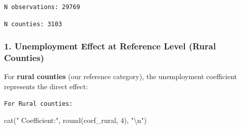 \documentclass[
  11pt,
]{article}
\newenvironment{Shaded}{\begin{snugshade}}{\end{snugshade}}
\newcommand{\DecValTok}[1]{\textcolor[rgb]{0.68,0.00,0.00}{#1}}
\newcommand{\FunctionTok}[1]{\textcolor[rgb]{0.28,0.35,0.67}{#1}}
\newcommand{\NormalTok}[1]{\textcolor[rgb]{0.00,0.23,0.31}{#1}}
\newcommand{\OtherTok}[1]{\textcolor[rgb]{0.00,0.23,0.31}{#1}}
\newcommand{\SpecialCharTok}[1]{\textcolor[rgb]{0.37,0.37,0.37}{#1}}
\newcommand{\StringTok}[1]{\textcolor[rgb]{0.13,0.47,0.30}{#1}}
\begin{document}
\begin{verbatim}
N observations: 29769 
\end{verbatim}

\begin{Shaded}
\end{Shaded}

\begin{verbatim}
N counties: 3103 
\end{verbatim}

\subsubsection{1. Unemployment Effect at Reference Level (Rural
Counties)}\label{unemployment-effect-at-reference-level-rural-counties}

For \textbf{rural counties} (our reference category), the unemployment
coefficient represents the direct effect:

\begin{Shaded}
\end{Shaded}

\begin{verbatim}
For Rural counties:
\end{verbatim}

\begin{Shaded}
\begin{Highlighting}[]
\FunctionTok{cat}\NormalTok{(}\StringTok{"  Coefficient:"}\NormalTok{, }\FunctionTok{round}\NormalTok{(coef\_rural, }\DecValTok{4}\NormalTok{), }\StringTok{"}\SpecialCharTok{\textbackslash{}n}\StringTok{"}\NormalTok{)}
\end{Highlighting}
\end{Shaded}
\end{document}
